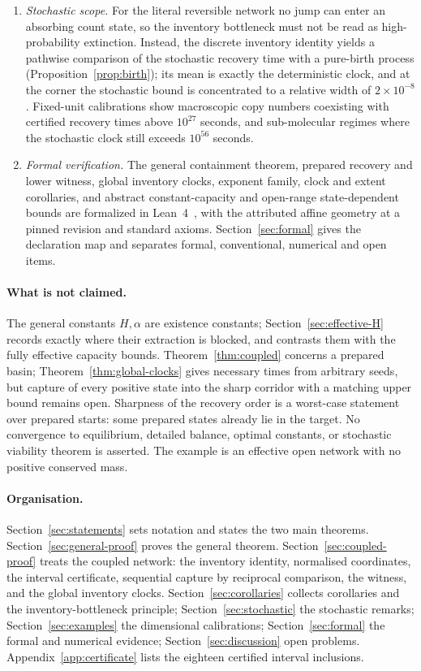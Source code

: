 \documentclass[11pt,a4paper]{article}
\theoremstyle{plain}
\theoremstyle{definition}
\theoremstyle{remark}
\begin{document}
\begin{enumerate}[label=(\roman*)]
\item \emph{Stochastic scope.} For the literal reversible network no jump can enter an absorbing count state, so the inventory bottleneck must not be read as high-probability extinction. Instead, the discrete inventory identity yields a pathwise comparison of the stochastic recovery time with a pure-birth process (Proposition~\ref{prop:birth}); its mean is exactly the deterministic clock, and at the corner the stochastic bound is concentrated to a relative width of $2\times10^{-8}$. Fixed-unit calibrations show macroscopic copy numbers coexisting with certified recovery times above $10^{27}$ seconds, and sub-molecular regimes where the stochastic clock still exceeds $10^{56}$ seconds.
\item \emph{Formal verification.} The general containment theorem, prepared recovery and lower witness, global inventory clocks, exponent family, clock and extent corollaries, and abstract constant-capacity and open-range state-dependent bounds are formalized in Lean~4~\cite{Lean4,Mathlib2020}, with the attributed affine geometry at a pinned revision and standard axioms. Section~\ref{sec:formal} gives the declaration map and separates formal, conventional, numerical and open items.
\end{enumerate}

\paragraph{What is not claimed.}
The general constants $H,\alpha$ are existence constants; Section~\ref{sec:effective-H} records exactly where their extraction is blocked, and contrasts them with the fully effective capacity bounds. Theorem~\ref{thm:coupled} concerns a prepared basin; Theorem~\ref{thm:global-clocks} gives necessary times from arbitrary seeds, but capture of every positive state into the sharp corridor with a matching upper bound remains open. Sharpness of the recovery order is a worst-case statement over prepared starts: some prepared states already lie in the target. No convergence to equilibrium, detailed balance, optimal constants, or stochastic viability theorem is asserted. The example is an effective open network with no positive conserved mass.

\paragraph{Organisation.}
Section~\ref{sec:statements} sets notation and states the two main theorems. Section~\ref{sec:general-proof} proves the general theorem. Section~\ref{sec:coupled-proof} treats the coupled network: the inventory identity, normalised coordinates, the interval certificate, sequential capture by reciprocal comparison, the witness, and the global inventory clocks. Section~\ref{sec:corollaries} collects corollaries and the inventory-bottleneck principle; Section~\ref{sec:stochastic} the stochastic remarks; Section~\ref{sec:examples} the dimensional calibrations; Section~\ref{sec:formal} the formal and numerical evidence; Section~\ref{sec:discussion} open problems. Appendix~\ref{app:certificate} lists the eighteen certified interval inclusions.
\end{document}
